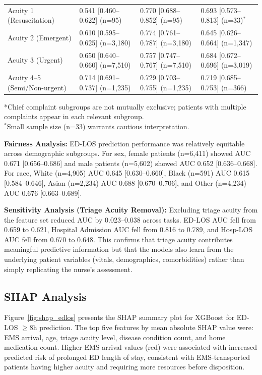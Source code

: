 \documentclass[harvard,article]{frontiersinFPHY_FAMS}
\begin{document}
\begin{table}[t]
\begin{tabularx}{\textwidth}{lXXX}
\midrule
Acuity 1 (Resuscitation)     & 0.541 [0.460--0.622] (n=95)   & 0.770 [0.688--0.852] (n=95)   & 0.693 [0.573--0.813] (n=33)$^*$ \\
Acuity 2 (Emergent)          & 0.610 [0.595--0.625] (n=3,180) & 0.774 [0.761--0.787] (n=3,180) & 0.645 [0.626--0.664] (n=1,347) \\
Acuity 3 (Urgent)            & 0.650 [0.640--0.660] (n=7,510) & 0.757 [0.747--0.767] (n=7,510) & 0.684 [0.672--0.696] (n=3,019) \\
Acuity 4--5 (Semi/Non-urgent) & 0.714 [0.691--0.737] (n=1,235) & 0.729 [0.703--0.755] (n=1,235) & 0.719 [0.685--0.753] (n=366) \\
\bottomrule
\end{tabularx}
\medskip
\footnotesize
*Chief complaint subgroups are not mutually exclusive; patients with multiple complaints appear in each relevant subgroup.\\
$^*$Small sample size (n=33) warrants cautious interpretation.
\end{table}

\noindent\textbf{Fairness Analysis:} ED-LOS prediction performance was relatively equitable across demographic subgroups. For sex, female patients (n=6,411) showed AUC 0.671 [0.656--0.686] and male patients (n=5,602) showed AUC 0.652 [0.636--0.668]. For race, White (n=4,905) AUC 0.645 [0.630--0.660], Black (n=591) AUC 0.615 [0.584--0.646], Asian (n=2,234) AUC 0.688 [0.670--0.706], and Other (n=4,234) AUC 0.676 [0.663--0.689].

\noindent\textbf{Sensitivity Analysis (Triage Acuity Removal):} Excluding triage acuity from the feature set reduced AUC by 0.023--0.038 across tasks. ED-LOS AUC fell from 0.659 to 0.621, Hospital Admission AUC fell from 0.816 to 0.789, and Hosp-LOS AUC fell from 0.670 to 0.648. This confirms that triage acuity contributes meaningful predictive information but that the models also learn from the underlying patient variables (vitals, demographics, comorbidities) rather than simply replicating the nurse's assessment.

\subsection{SHAP Analysis}

Figure~\ref{fig:shap_edlos} presents the SHAP summary plot for XGBoost for ED-LOS $\geq$8h prediction. The top five features by mean absolute SHAP value were: EMS arrival, age, triage acuity level, disease condition count, and home medication count. Higher EMS arrival values (red) were associated with increased predicted risk of prolonged ED length of stay, consistent with EMS-transported patients having higher acuity and requiring more resources before disposition.
\end{document}
